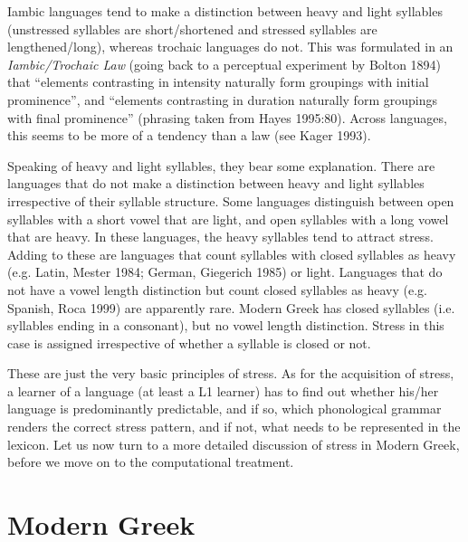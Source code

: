 \documentclass[a4paper]{article}
\begin{document}
Iambic languages tend to make a distinction between heavy and light syllables (unstressed syllables are short/shortened and stressed syllables are lengthened/long), whereas trochaic languages do not. This was formulated in an \textit{Iambic/Trochaic Law} (going back to a perceptual experiment by Bolton 1894) that “elements contrasting in intensity naturally form groupings with initial prominence”, and “elements contrasting in duration naturally form groupings with final prominence” (phrasing taken from Hayes 1995:80). Across languages, this seems to be more of a tendency than a law (see Kager 1993).

Speaking of heavy and light syllables, they bear some explanation. There are languages that do not make a distinction between heavy and light syllables irrespective of their syllable structure. Some languages distinguish between open syllables with a short vowel that are light, and open syllables with a long vowel that are heavy. In these languages, the heavy syllables tend to attract stress. Adding to these are languages that count syllables with closed syllables as heavy (e.g. Latin, Mester 1984; German, Giegerich 1985) or light. Languages that do not have a vowel length distinction but count closed syllables as heavy (e.g. Spanish, Roca 1999) are apparently rare. Modern Greek has closed syllables (i.e. syllables ending in a consonant), but no vowel length distinction. Stress in this case is assigned irrespective of whether a syllable is closed or not.

These are just the very basic principles of stress. As for the acquisition of stress, a learner of a language (at least a L1 learner) has to find out whether his/her language is predominantly predictable, and if so, which phonological grammar renders the correct stress pattern, and if not, what needs to be represented in the lexicon. Let us now turn to a more detailed discussion of stress in Modern Greek, before we move on to the computational treatment.

\section{
Modern Greek}
\end{document}
